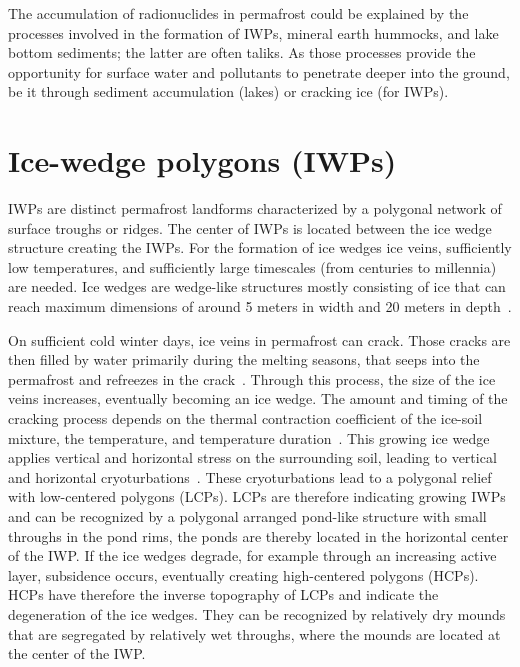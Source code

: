 The accumulation of radionuclides in permafrost could be explained by the processes involved in the formation of IWPs, mineral earth hummocks, and lake bottom sediments; the latter are often taliks. As those processes provide the opportunity for surface water and pollutants to penetrate deeper into the ground, be it through sediment accumulation (lakes) or cracking ice (for IWPs). 

\section{Ice-wedge polygons (IWPs)}
IWPs are distinct permafrost landforms characterized by a polygonal network of surface troughs or ridges. 
The center of IWPs is located between the ice wedge structure creating the IWPs. 
For the formation of ice wedges ice veins, sufficiently low temperatures, and sufficiently large timescales (from centuries to millennia) are needed. 
Ice wedges are wedge-like structures mostly consisting of ice that can reach maximum dimensions of around 5 meters in width and 20 meters in depth~\citep{ulrichQuantifyingWedgeIceVolumes2014}.

On sufficient cold winter days, ice veins in permafrost can crack. 
Those cracks are then filled by water primarily during the melting seasons, that seeps into the permafrost and refreezes in the crack~\citep{fortierLateHoloceneSyngenetic2004,liljedahlPanArcticIcewedgeDegradation2016}. 
Through this process, the size of the ice veins increases, eventually becoming an ice wedge. The amount and timing of the cracking process depends on the thermal contraction coefficient of the ice-soil mixture, the temperature, and temperature duration~\citep{fortierLateHoloceneSyngenetic2004}. 
This growing ice wedge applies vertical and horizontal stress on the surrounding soil, leading to vertical and horizontal cryoturbations~\citep{fortierLateHoloceneSyngenetic2004,liljedahlPanArcticIcewedgeDegradation2016}. These cryoturbations lead to a polygonal relief with low-centered polygons (LCPs). 
LCPs are therefore indicating growing IWPs and can be recognized by a polygonal arranged pond-like structure with small throughs in the pond rims, the ponds are thereby located in the horizontal center of the IWP. If the ice wedges degrade, for example through an increasing active layer, subsidence occurs, eventually creating high-centered polygons (HCPs). 
HCPs have therefore the inverse topography of LCPs and indicate the degeneration of the ice wedges. They can be recognized by relatively dry mounds that are segregated by relatively wet throughs, where the mounds are located at the center of the IWP.


